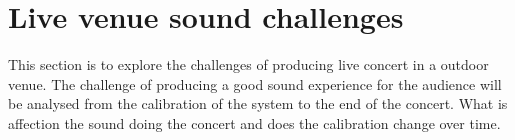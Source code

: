 \section{Live venue sound challenges}
This section is to explore the challenges of producing live concert in a outdoor venue. The challenge of producing a good sound experience for the audience will be analysed from the calibration of the system to the end of the concert. What is affection the sound doing the concert and does the calibration change over time.
